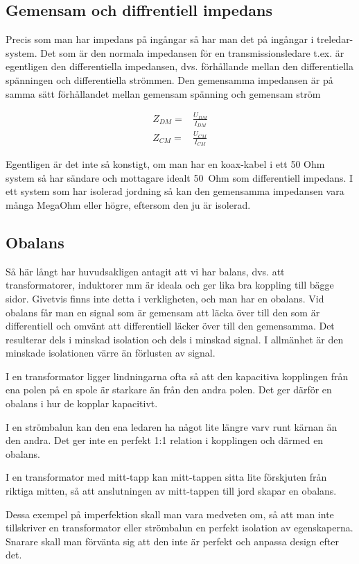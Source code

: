 \subsection{Gemensam och diffrentiell impedans}

Precis som man har impedans på ingångar så har man det på ingångar i treledar-
system. Det som är den normala impedansen för en transmissionsledare t.ex. är
egentligen den differentiella impedansen, dvs. förhållande mellan den
differentiella spänningen och differentiella strömmen. Den gemensamma impedansen
är på samma sätt förhållandet mellan gemensam spänning och gemensam ström

\begin{eqnarray}
Z_{DM} = & \frac{U_{DM}}{I_{DM}}\\
Z_{CM} = & \frac{U_{CM}}{I_{CM}}
\end{eqnarray}

Egentligen är det inte så konstigt, om man har en koax-kabel i ett 50 Ohm
system så har sändare och mottagare idealt 50~Ohm som differentiell impedans.
I ett system som har isolerad jordning så kan den gemensamma impedansen vara
många MegaOhm eller högre, eftersom den ju är isolerad.

\subsection{Obalans}

Så här långt har huvudsakligen antagit att vi har balans, dvs. att
transformatorer, induktorer mm är ideala och ger lika bra koppling till bägge
sidor. Givetvis finns inte detta i verkligheten, och man har en obalans.
Vid obalans får man en signal som är gemensam att läcka över till den som är
differentiell och omvänt att differentiell läcker över till den gemensamma.
Det resulterar dels i minskad isolation och dels i minskad signal.
I allmänhet är den minskade isolationen värre än förlusten av signal.

I en transformator ligger lindningarna ofta så att den kapacitiva kopplingen
från ena polen på en spole är starkare än från den andra polen.
Det ger därför en obalans i hur de kopplar kapacitivt.

I en strömbalun kan den ena ledaren ha något lite längre varv runt kärnan än
den andra. Det ger inte en perfekt 1:1 relation i kopplingen och därmed en
obalans.

I en transformator med mitt-tapp kan mitt-tappen sitta lite förskjuten från
riktiga mitten, så att anslutningen av mitt-tappen till jord skapar en
obalans.

Dessa exempel på imperfektion skall man vara medveten om, så att man inte
tillskriver en transformator eller strömbalun en perfekt isolation av
egenskaperna. Snarare skall man förvänta sig att den inte är perfekt och
anpassa design efter det.
